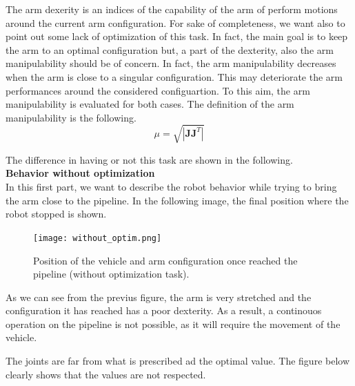 \documentclass{article}
\begin{document}
The arm dexerity is an indices of the capability of the arm of perform motions around the current arm configuration. 
For sake of completeness, we want also to point out some lack of optimization of this task. In fact, the main goal is to keep the arm to an optimal configuration but, a part of the dexterity, also the arm manipulability should be of concern. In fact, the arm manipulability decreases when the arm is close to a singular configuration. This may deteriorate the arm performances around the considered configuartion. To this aim, the arm manipulability is evaluated for both cases. The definition of the arm manipulability is the following. 
$$
	\mu = \sqrt{\left| \bm{J} \bm{J}^T \right|}
$$

The difference in having or not this task are shown in the following. \\

{\large \textbf{Behavior without optimization}} \\
In this first part, we want to describe the robot behavior while trying to bring the arm close to the pipeline. In the following image, the final position where the robot stopped is shown. \\


\begin{figure}[H]
	\centering
	{\texttt{[image: without\_optim.png]}}
	\caption{Position of the vehicle and arm configuration once reached the pipeline (without optimization task).}
	\label{im:without_optim}
\end{figure}



As we can see from the previus figure, the arm is very stretched and the configuration it has reached has a poor dexterity. As a result, a continouos operation on the pipeline is not possible, as it will require the movement of the vehicle. 

The joints are far from what is prescribed ad the optimal value. The figure below clearly shows that the values are not respected. 

\begin{figure}[H]
	\centering
	\hspace{10mm}
	\hspace{10mm}
	\label{im:Without_optim_results}
\end{figure} 
\end{document}
